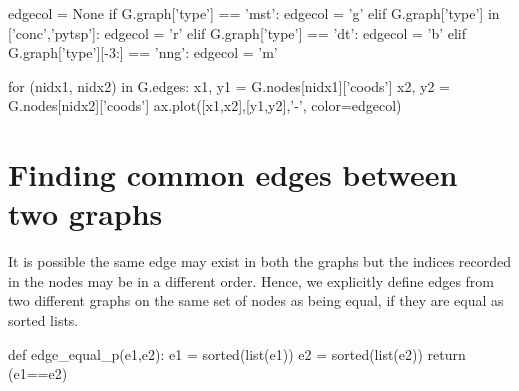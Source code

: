 \nwenddocs{}\endmoddef\nwstartdeflinemarkup{}\nwenddeflinemarkup
edgecol = None
if G.graph['type'] == 'mst':
     edgecol = 'g'
elif G.graph['type'] in ['conc','pytsp']:
     edgecol = 'r'
elif G.graph['type'] == 'dt':
     edgecol = 'b'
elif G.graph['type'][-3:] == 'nng':
     edgecol = 'm'
\nwendcode{}\nwdocspar


\nwenddocs{}\endmoddef\nwstartdeflinemarkup{}\nwenddeflinemarkup
for  (nidx1, nidx2) in G.edges:
     x1, y1 = G.nodes[nidx1]['coods']
     x2, y2 = G.nodes[nidx2]['coods']
     ax.plot([x1,x2],[y1,y2],'-', color=edgecol)
     
\nwendcode{}\nwdocspar



\section{Finding common edges between two graphs}


It is possible the same edge may exist in both the graphs
but the indices recorded in the nodes may be in a different order. 
Hence, we explicitly define edges from two different graphs on the same set of nodes
as being equal, if they are equal as sorted lists.

\nwenddocs{}\endmoddef\nwstartdeflinemarkup{}\nwenddeflinemarkup
def edge_equal_p(e1,e2):
     e1 = sorted(list(e1))
     e2 = sorted(list(e2))
     return (e1==e2)
\nwendcode{}\nwdocspar

